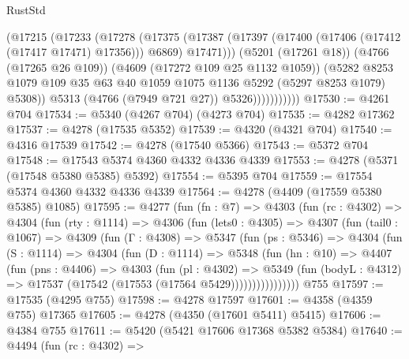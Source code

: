\begin{lexlean}{RustStd}
\begin{coremodule}
{\begin{coremodule}
{{{{{{{{{{{{{{{{{{{{{{{{{{{{{{{{{{{                        (@17215
                          (@17233
                            (@17278
                              (@17375
                                (@17387
                                  (@17397 (@17400 (@17406 (@17412 (@17417 @17471) @17356))) @6869)
                                  @17471)))
                            (@5201 (@17261 @18))
                            (@4766 (@17265 @26 @109))
                            (@4609 (@17272 @109 @25 @1132 @1059))
                            (@5282
                              @8253
                              @1079
                              @109
                              @35
                              @63
                              @40
                              @1059
                              @1075
                              @1136
                              @5292
                              (@5297 @8253 @1079)
                              @5308))
                          @5313
                          (@4766 (@7949 @721 @27))
                          @5326)))))))))))
@17530 := @4261 @704
@17534 := @5340 (@4267 @704) (@4273 @704)
@17535 := @4282 @17362
@17537 := @4278 (@17535 @5352)
@17539 := @4320 (@4321 @704)
@17540 := @4316 @17539
@17542 := @4278 (@17540 @5366)
@17543 := @5372 @704
@17548 := @17543 @5374 @4360 @4332 @4336 @4339
@17553 := @4278 (@5371 (@17548 @5380 @5385) @5392)
@17554 := @5395 @704
@17559 := @17554 @5374 @4360 @4332 @4336 @4339
@17564 := @4278 (@4409 (@17559 @5380 @5385) @1085)
@17595 := @4277
    (fun (fn : @7) =>
    @4303
      (fun (rc : @4302) =>
      @4304
        (fun (rty : @1114) =>
        @4306
          (fun (lets0 : @4305) =>
          @4307
            (fun (tail0 : @1067) =>
            @4309
              (fun (Γ : @4308) =>
              @5347
                (fun (ps : @5346) =>
                @4304
                  (fun (S : @1114) =>
                  @4304
                    (fun (D : @1114) =>
                    @5348
                      (fun (hn : @10) =>
                      @4407
                        (fun (pns : @4406) =>
                        @4303
                          (fun (pl : @4302) =>
                          @5349
                            (fun (bodyL : @4312) =>
                            @17537 (@17542 (@17553 (@17564 @5429))))))))))))))))
    @755
@17597 := @17535 (@4295 @755)
@17598 := @4278 @17597
@17601 := @4358 (@4359 @755) @17365
@17605 := @4278 (@4350 (@17601 @5411) @5415)
@17606 := @4384 @755
@17611 := @5420 (@5421 @17606 @17368 @5382 @5384)
@17640 := @4494
    (fun (rc : @4302) =>
}}}}}}}}}}}}}}}}}}}}}}}}}}}}}}}}}}}
\end{coremodule}}
\end{coremodule}
\end{lexlean}
